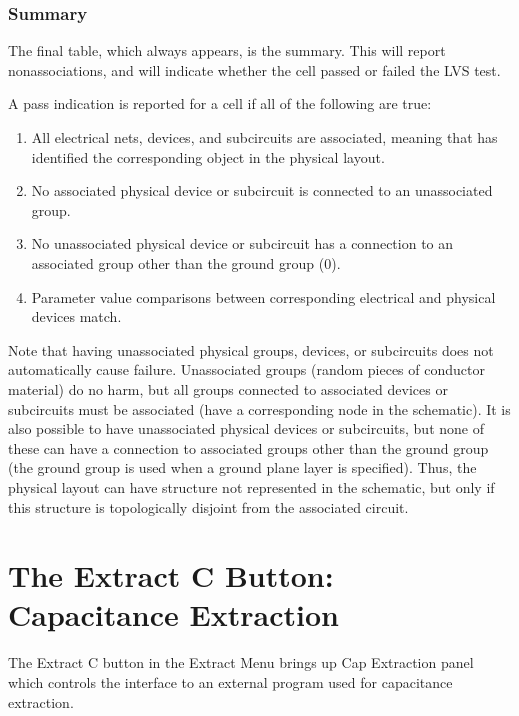 \subsubsection{Summary}

The final table, which always appears, is the summary.  This will
report nonassociations, and will indicate whether the cell passed
or failed the LVS test.

A pass indication is reported for a cell if all of the following
are true:
\begin{enumerate}
\item{All electrical nets, devices, and subcircuits are associated,
meaning that {\Xic} has identified the corresponding object in
the physical layout.}
\item{No associated physical device or subcircuit is connected to an
unassociated group.}
\item{No unassociated physical device or subcircuit has a connection
to an associated group other than the ground group (0).}
\item{Parameter value comparisons between corresponding electrical
and physical devices match.}
\end{enumerate}

Note that having unassociated physical groups, devices, or subcircuits
does not automatically cause failure.  Unassociated groups (random
pieces of conductor material) do no harm, but all groups connected to
associated devices or subcircuits must be associated (have a
corresponding node in the schematic).  It is also possible to have
unassociated physical devices or subcircuits, but none of these can
have a connection to associated groups other than the ground group
(the ground group is used when a ground plane layer is specified).
Thus, the physical layout can have structure not represented in the
schematic, but only if this structure is topologically disjoint from
the associated circuit.

\section{The {\cb Extract C} Button: Capacitance Extraction}

The {\cb Extract C} button in the {\cb Extract Menu} brings up {\cb
Cap Extraction} panel which controls the interface to an external
program used for capacitance extraction.


